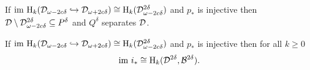 \begin{theorem}\label{thm:tcc}
    If $\mathrm{im}~\mathrm{H}_k({\mathcal{D}}_{\omega-2c\delta}\hookrightarrow {\mathcal{D}}_{\omega+{2c\delta}})\cong \mathrm{H}_k({\mathcal{D}}_{\omega - 2c\delta}^{2\delta})$ and $p_*$ is injective then ${\mathcal{D}}\setminus{\mathcal{D}}_{\omega-2c\delta}^{2\delta}\subseteq P^\delta$ and $Q^\delta$ separates ${\mathcal{D}}$.
\end{theorem}

\begin{corollary}
    If $\mathrm{im}~\mathrm{H}_k({\mathcal{D}}_{\omega-2c\delta}\hookrightarrow {\mathcal{D}}_{\omega+{2c\delta}})\cong \mathrm{H}_k({\mathcal{D}}_{\omega - 2c\delta}^{2\delta})$ and $p_*$ is injective then for all $k\geq 0$
    \[ \mathrm{im}~i_* \cong \mathrm{H}_k({\mathcal{D}}^{2\delta}, {\mathcal{B}}^{2\delta}).\]
\end{corollary}

%
